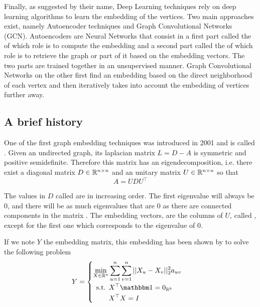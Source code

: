 Finally, as suggested by their name, Deep Learning techniques rely on deep learning algorithms to learn the embedding of the vertices. Two main approaches exist, namely Autoencoder techniques and Graph Convolutional Networks (GCN). Autoencoders are Neural Networks that consist in a first part called the  of which role is to compute the embedding and a second part called the  of which role is to retrieve the graph or part of it based on the embedding vectors. The two parts are trained together in an unsupervised manner. Graph Convolutional Networks on the other first find an embedding based on the direct neighborhood of each vertex and then iteratively takes into account the embedding of vertices further away.

\subsection{A brief history}\label{subsec:embedding_history}
One of the first graph embedding techniques was introduced in 2001 and is called  \cite{belkin2001_spectralEmbedding}. Given an undirected graph, its laplacian matrix $ L = D - A$ is symmetric and positive semidefinite. Therefore this matrix has an eigendecomposition, i.e. there exist a diagonal matrix $D \in \mathbb{R}^{n\times n}$ and an unitary matrix $U \in \mathbb{R}^{n \times n}$ so that
\begin{equation}
    A = U D U^\top
\end{equation}

The values in $D$ called  are in increasing order. The first eigenvalue will always be $0$, and there will be as much eigenvalues that are $0$ as there are connected components in the matrix \cite{belkin2001_spectralEmbedding}. The embedding vectors, are the columns of $U$, called , except for the first one which corresponds to the eigenvalue of 0.

If we note $Y$ the embedding matrix, this embedding has been shown by \cite{belkin2001_spectralEmbedding} to solve the following problem
\begin{equation}
    Y = \begin{cases}
    \begin{aligned}
        \min_{X \in \realset^n} &\sum_{u = 1}^n\sum_{v=1}^n ||X_u - X_v||_2^2a_{uv}\\
        \text{s.t.  } & X^\top \ones = \zeros{\realset^k}\\
                    & X^\top X = I
    \end{aligned}
    \end{cases}
\end{equation}

